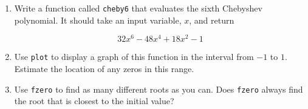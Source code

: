 \begin{ex}

\begin{enumerate}


\item Write a function called \lstinline{cheby6} that evaluates the
sixth Chebyshev polynomial.  It should take an input variable,
$x$, and return

\begin{equation*}
32 x^6 - 48 x^4 + 18 x^2 - 1
\end{equation*}

\item Use \lstinline{plot} to display a graph of this function in the
interval from $-1$ to $1$.  Estimate the location of any zeros in this
range.

\item Use \lstinline{fzero} to find as many different roots as you can.
Does \lstinline{fzero} always find the root that is closest to the initial
value?

\end{enumerate}

\end{ex}


